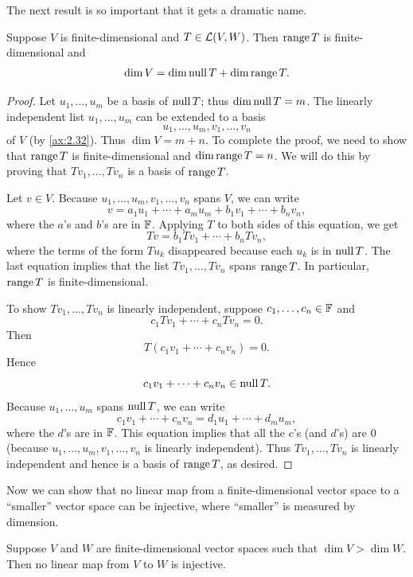 The next result is so important that it gets a dramatic name.

\begin{result}\label{ax:3.21}
Suppose $V$ is finite-dimensional and $T\in\mathcal{L}(V,W)$. Then $\operatorname{range} T$ is
finite-dimensional and
\[ \operatorname{dim} V=\operatorname{dim}\operatorname{null} T+\operatorname{dim}\operatorname{range} T. \]
\end{result}

\begin{proof}
Let $u_1,\dots,u_m$ be a basis of $\operatorname{null} T$; thus $\operatorname{dim}\operatorname{null} T=m$. The linearly
independent list $u_1,\dots,u_m$ can be extended to a basis
\[ u_1,\dots,u_m,v_1,\dots,v_n \]
of $V$ (by \ref{ax:2.32}). Thus $\dim V=m+n$. To complete the proof, we need to
show that $\operatorname{range} T$ is finite-dimensional and $\operatorname{dim}\operatorname{range} T=n$. We will do
this by proving that $Tv_1,\dots,Tv_n$ is a basis of $\operatorname{range} T$.

Let $v\in V$. Because $u_1,\dots,u_m,v_1,\dots,v_n$ spans $V$, we can write
\[ v=a_1u_1+\cdots+a_mu_m+b_1v_1+\cdots+b_nv_n, \]
where the $a$'s and $b$'s are in $\mathbb{F}$. Applying $T$ to both sides of this
equation, we get
\[ Tv=b_1Tv_1+\cdots+b_nTv_n, \]
where the terms of the form $Tu_k$ disappeared because each $u_k$ is in
$\operatorname{null} T$. The last equation implies that the list $Tv_1,\dots,Tv_n$ spans
$\operatorname{range} T$. In particular, $\operatorname{range} T$ is finite-dimensional.

To show $Tv_1,\dots,Tv_n$ is linearly independent, suppose
$c_1,\dots,c_n\in\mathbb{F}$ and
\[ c_1Tv_1+\cdots+c_nTv_n=0. \]
Then
\[ T(c_1v_1+\cdots+c_nv_n)=0. \]
Hence
\[ c_1v_1+\cdots+c_nv_n\in\operatorname{null} T. \]
Because $u_1,\dots,u_m$ spans $\operatorname{null} T$, we can write
\[ c_1v_1+\cdots+c_nv_n=d_1u_1+\cdots+d_mu_m, \]
where the $d$'s are in $\mathbb{F}$. This equation implies that all the $c$'s (and
$d$'s) are $0$ (because $u_1,\dots,u_m,v_1,\dots,v_n$ is linearly
independent). Thus $Tv_1,\dots,Tv_n$ is linearly independent and hence is a
basis of $\operatorname{range} T$, as desired.
\end{proof}

Now we can show that no linear map from a finite-dimensional vector space to a
``smaller'' vector space can be injective, where ``smaller'' is measured by
dimension.

\begin{result}\label{ax:3.22}
Suppose $V$ and $W$ are finite-dimensional vector spaces such that
$\dim V>\dim W$. Then no linear map from $V$ to $W$ is injective.
\end{result}

